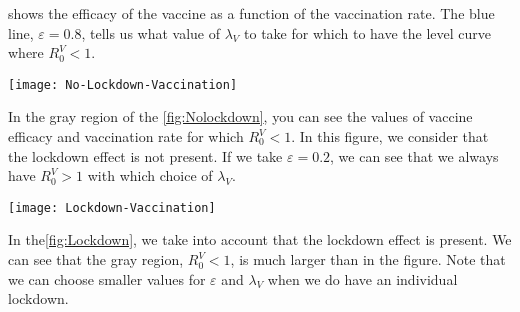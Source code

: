 shows the efficacy of the vaccine
as a function of the vaccination rate. The blue line, $ \varepsilon = 0.8 $,
tells us what value of $ \lambda_V $ to take for which to have
the level curve where $ R_0^V<1 $.
%
\begin{figure*}[tbh]
    \centering
      \texttt{[image: No-Lockdown-Vaccination]}
    \caption{
        Vaccine efficacy versus vaccination rate feasibility.
        In the gray shaded region $R_V<1 $ and in the white region $ R_V >1 $. 
        Note that, for our scenario, we consider no lockdown individuals.
    \href{https://plotly.com/~AdrianSalcedo/52/}{%
		https://plotly.com/~AdrianSalcedo/52/}
    }
    \label{fig:Nolockdown}
\end{figure*}
%
%
In the gray region of the \cref{fig:Nolockdown}, you can see
the values of vaccine efficacy and vaccination rate for which
$R_0^V <1 $. In this figure, we consider that the lockdown effect is not present.
If we take $ \varepsilon = 0.2 $, we can see that we always have $ R_0^V> 1 $
with which choice of $ \lambda_V $.

\begin{figure*}[tbh]
    \centering
      \texttt{[image: Lockdown-Vaccination]}
    \caption{%
        Vaccine efficacy versus vaccination rate feasibility.
        In the gray shaded region $R_V<1 $ and in the white region $ R_V >1 $. 
        Note that, for our scenario, we consider lockdown individuals.}
    \label{fig:Lockdown}
\end{figure*}
%
In the\cref{fig:Lockdown}, we take into account that the lockdown effect is
present. We can see that the gray region, $R_0^V<1 $, is much larger than in
the figure. Note that we can choose smaller values for $ \varepsilon $ and 
$\lambda_V $ when we do have an individual lockdown.
